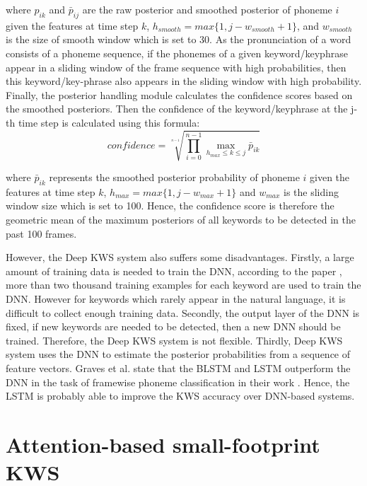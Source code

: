 \begin{description}
            where $p_{ik}$ and $\bar{p}_{ij}$ are the raw posterior and smoothed posterior of phoneme $i$ given the features at time step $k$, $h_{smooth} = max\{1, j - w_{smooth} + 1\}$, and $w_{smooth}$ is the size of smooth window which is set to 30.
            As the pronunciation of a word consists of a phoneme sequence, if the phonemes of a given keyword/keyphrase appear in a sliding window of the frame sequence with high probabilities, then this keyword/key-phrase also appears in the sliding window with high probability.
            Finally, the posterior handling module calculates the confidence scores based on the smoothed posteriors.
            Then the confidence of the keyword/keyphrase at the j-th time step is calculated using this formula:
            \begin{equation}
                confidence = \sqrt[^{n-1}]{\prod_{i=0}^{n-1}{\max_{h_{max} \le k \le j}{\bar{p}_{ik}}}}
            \end{equation}

            where $\bar{p}_{ik}$ represents the smoothed posterior probability of phoneme $i$ given the features at time step $k$, $h_{max} = max\{1, j - w_{max} + 1\}$ and $w_{max}$ is the sliding window size which is set to 100. 
            Hence, the confidence score is therefore the geometric mean of the maximum posteriors of all keywords to be detected in the past 100 frames.
        \end{description}
        However, the Deep KWS system also suffers some disadvantages. Firstly, a large amount of training data is needed to train the DNN, according to the paper \cite{CPH14}, more than two thousand training examples for each keyword are used to train the DNN.
        However for keywords which rarely appear in the natural language, it is difficult to collect enough training data.
        Secondly, the output layer of the DNN is fixed, if new keywords are needed to be detected, then a new DNN should be trained.
        Therefore, the Deep KWS system is not flexible. 
        Thirdly, Deep KWS system uses the DNN to estimate the posterior probabilities from a sequence of feature vectors.  
        Graves et al. state that the BLSTM and LSTM outperform the DNN in the task of framewise phoneme classification in their work \cite{GS05}.
        Hence, the LSTM is probably able to improve the KWS accuracy over DNN-based systems.

    \section{Attention-based small-footprint KWS} \label{sec:related_attention}

